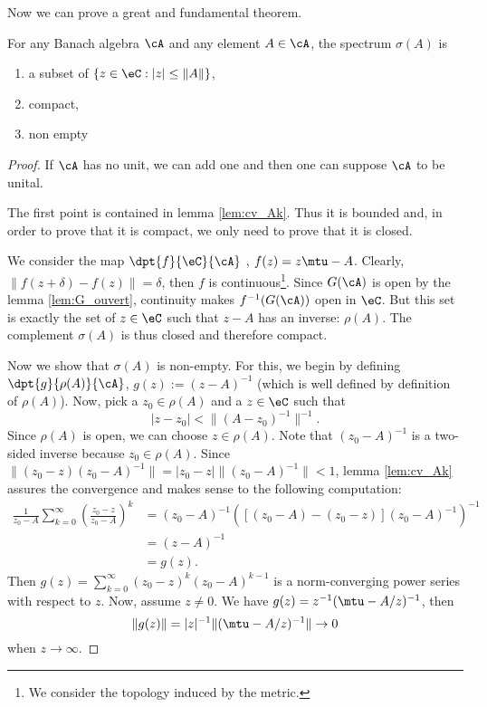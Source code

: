 Now we can prove a great and fundamental theorem.

\begin{theorem}			\label{ThoSpecBanach}
    For any Banach algebra $\cA$ and any element $A\in\cA$, the spectrum $\sigma(A)$ is
    \begin{enumerate}
        \item       \label{ItemThoSpecBanachi}
            a subset of $\{z\in\eC:|z|\leq\|A\|\}$,
        \item
            compact,
        \item
            non empty
        \end{enumerate}
\end{theorem} \label{tho:prop_sigma}

\begin{proof}
	If $\cA$ has no unit, we can add one and then one can suppose $\cA$ to be unital.

	The first point is contained in lemma \ref{lem:cv_Ak}. Thus it is bounded and, in order to prove that it is compact, we only need to prove that it is closed.

	We consider the map $\dpt{f}{\eC}{\cA}$ , $f(z)=z\mtu-A$. Clearly, $\|f(z+\delta)-f(z)\|=\delta$, then $f$ is continuous\footnote{We consider the topology induced by the metric.}. Since $G(\cA)$ is open by the lemma \ref{lem:G_ouvert}, continuity makes $f^{-1}(G(\cA))$ open in $\eC$. But this set is exactly the set of $z\in\eC$ such that $z-A$ has an inverse: $\rho(A)$. The complement $\sigma(A)$ is thus closed and therefore compact.

	Now we show that $\sigma(A)$ is non-empty. For this, we begin by defining $\dpt{g}{\rho(A)}{\cA}$, 
	$g(z):=(z-A)^{-1}$ (which is well defined by definition of $ \rho(A)$). Now, pick a $z_0\in\rho(A)$ and a $z\in\eC$ such that 
	\[
	   |z-z_0|<\| (A-z_0)^{-1} \|^{-1}.
	\]
	Since $\rho(A)$ is open, we can choose $z\in\rho(A)$. Note that $(z_0-A)^{-1}$ is a two-sided inverse because $z_0\in\rho(A)$. Since $\| (z_0-z)(z_0-A)^{-1} \|=|z_0-z|\| (z_0-A)^{-1} \|<1$,  lemma \ref{lem:cv_Ak} assures the convergence and makes sense to the following computation:
	\begin{equation}
	\begin{split}   
	   \frac{1}{z_0-A}\sum_{k=0}^{\infty}(\frac{z_0-z}{z_0-A})^k
	      &=   (z_0-A)^{-1}\left(   [(z_0-A)-(z_0-z)](z_0-A)^{-1}
	       \right)^{-1}\\
	      &=(z-A) ^{-1}\\
	      &=g(z).
	\end{split}      
	\end{equation}
	Then $g(z)=\sum_{k=0}^{\infty}(z_0-z)^k(z_0-A)^{k-1}$ is a norm-converging power series with respect to $z$. Now, assume $z\neq 0$. We have $g(z)=z^{-1}(\mtu-A/z)^{-1}$, then 
	\begin{equation}\label{eq:cv_de_g}
	   \|g(z)\|=|z|^{-1}\| (\mtu-A/z)^{-1} \|\to 0 
	\end{equation}
	when $z\to\infty$.


\end{proof}
